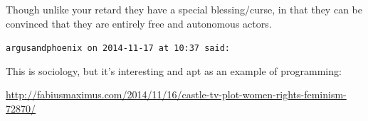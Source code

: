 \begin{footnotesize}
\begin{sffamily}
Though unlike your retard they have a special blessing/curse, in that they can be convinced that they are entirely free and autonomous actors.

\hfill

\texttt{argusandphoenix on 2014-11-17 at 10:37 said:}

This is sociology, but it's interesting and apt as an example of programming:

\url{http://fabiusmaximus.com/2014/11/16/castle-tv-plot-women-rights-feminism-72870/}


\end{sffamily}
\end{footnotesize}


